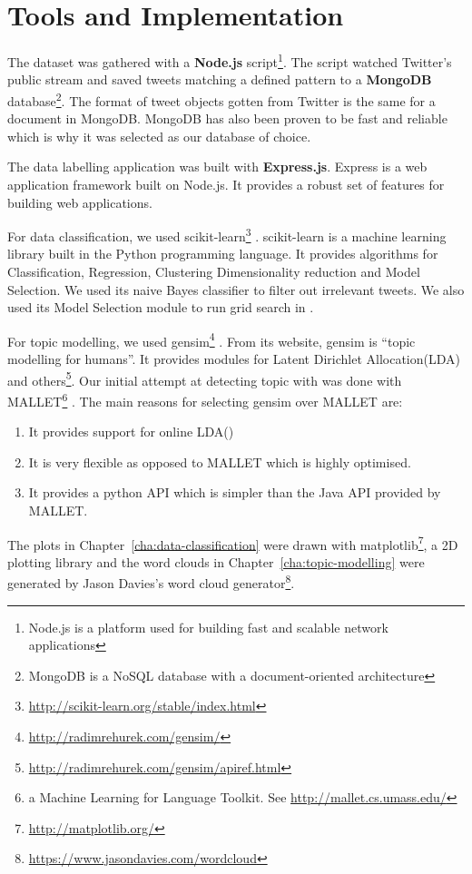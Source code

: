 \chapter{Tools and Implementation}
\label{cha:tools-and-implementation}

The dataset was gathered with a \textbf{Node.js} script\footnote{Node.js is a platform used for
building fast and scalable network applications}. The script watched Twitter's public stream and
saved tweets matching a defined pattern to a \textbf{MongoDB} database\footnote{MongoDB is a NoSQL
database with a document-oriented architecture}. The format of tweet objects gotten from Twitter
is the same for a document in MongoDB\@. MongoDB has also been proven to be fast and reliable
which is why it was selected as our database of choice.

The data labelling application was built with \textbf{Express.js}. Express is a web application
framework built on Node.js. It provides a robust set of features for building web applications.

For data classification, we used
scikit-learn\footnote{\url{http://scikit-learn.org/stable/index.html}} \citep{scikit-learn}.
scikit-learn is a machine learning library built in the Python programming language. It provides
algorithms for Classification, Regression, Clustering Dimensionality reduction and Model Selection.
We used its naive Bayes classifier to filter out irrelevant tweets. We also used its Model Selection
module to run grid search in .

For topic modelling, we used gensim\footnote{\url{http://radimrehurek.com/gensim/}}
\citep{rehurek_lrec}. From its website, gensim is ``topic modelling for humans''. It provides
modules for Latent Dirichlet Allocation(LDA) and
others\footnote{\url{http://radimrehurek.com/gensim/apiref.html}}. Our initial attempt at detecting
topic with was done with MALLET\footnote{a Machine Learning for Language Toolkit. See
\url{http://mallet.cs.umass.edu/}} \citep{McCallumMALLET}. The main reasons for selecting gensim
over MALLET are:
\begin{enumerate}
  \item It provides support for online LDA()
  \item It is very flexible as opposed to MALLET which is highly optimised.
  \item It provides a python API which is simpler than the Java API provided by MALLET.
\end{enumerate}

The plots in Chapter~\ref{cha:data-classification} were drawn with
matplotlib\footnote{\url{http://matplotlib.org/}}, a 2D plotting library and the word clouds in
Chapter~\ref{cha:topic-modelling} were generated by Jason Davies's word cloud
generator\footnote{\url{https://www.jasondavies.com/wordcloud}}.

